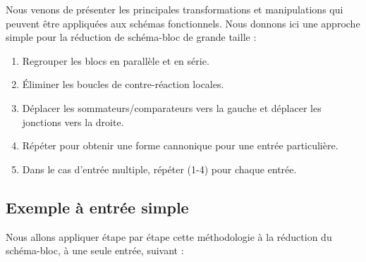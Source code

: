 Nous venons de présenter les principales transformations et manipulations qui peuvent être
appliquées aux schémas fonctionnels. Nous donnons ici une approche simple pour la 
réduction de schéma-bloc de grande taille \cite{Ostertag}:
\begin{enumerate}
    \item Regrouper les blocs en parallèle et en série.
    \item \'Eliminer les boucles de contre-réaction locales.
    \item Déplacer les sommateurs/comparateurs vers la gauche et déplacer les jonctions vers la droite.
    \item Répéter pour obtenir une forme cannonique pour une entrée particulière.
    \item Dans le cas d'entrée multiple, répéter (1-4) pour chaque entrée. 
\end{enumerate}

\subsection{Exemple à entrée simple}
Nous allons appliquer étape par étape cette méthodologie à la réduction du schéma-bloc, à une seule entrée, suivant :

\begin{center}                                                                                                                
\end{center}                                                                                                                  

